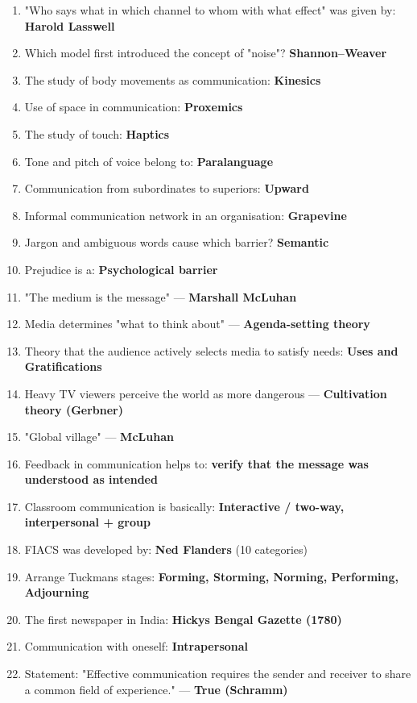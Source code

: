 \begin{enumerate}
\def\labelenumi{\arabic{enumi}.}
\tightlist
\item
  "Who says what in which channel to whom with what effect" was given by: \textbf{Harold Lasswell}
\item
  Which model first introduced the concept of "noise"? \textbf{Shannon--Weaver}
\item
  The study of body movements as communication: \textbf{Kinesics}
\item
  Use of space in communication: \textbf{Proxemics}
\item
  The study of touch: \textbf{Haptics}
\item
  Tone and pitch of voice belong to: \textbf{Paralanguage}
\item
  Communication from subordinates to superiors: \textbf{Upward}
\item
  Informal communication network in an organisation: \textbf{Grapevine}
\item
  Jargon and ambiguous words cause which barrier? \textbf{Semantic}
\item
  Prejudice is a: \textbf{Psychological barrier}
\item
  "The medium is the message" --- \textbf{Marshall McLuhan}
\item
  Media determines "what to think about" --- \textbf{Agenda-setting theory}
\item
  Theory that the audience actively selects media to satisfy needs: \textbf{Uses and Gratifications}
\item
  Heavy TV viewers perceive the world as more dangerous --- \textbf{Cultivation theory (Gerbner)}
\item
  "Global village" --- \textbf{McLuhan}
\item
  Feedback in communication helps to: \textbf{verify that the message was understood as intended}
\item
  Classroom communication is basically: \textbf{Interactive / two-way, interpersonal + group}
\item
  FIACS was developed by: \textbf{Ned Flanders} (10 categories)
\item
  Arrange Tuckman\textquotesingle s stages: \textbf{Forming, Storming, Norming, Performing, Adjourning}
\item
  The first newspaper in India: \textbf{Hicky\textquotesingle s Bengal Gazette (1780)}
\item
  Communication with oneself: \textbf{Intrapersonal}
\item
  Statement: "Effective communication requires the sender and receiver to share a common field of experience." --- \textbf{True (Schramm)}
\end{enumerate}

